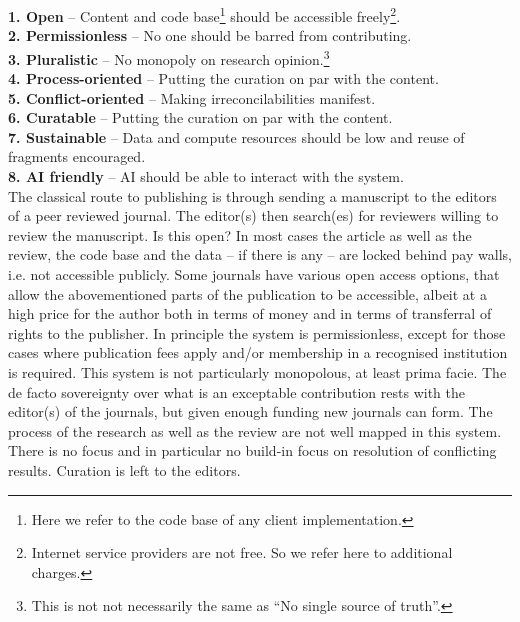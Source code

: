 \documentclass[14pt]{article}
\begin{document}
\indent \textbf{1. Open} -- 
 Content and code base\footnote{Here we refer to the code base of any client implementation.} should be accessible freely\footnote{Internet service providers are not free. So we refer here to additional charges.}.\\
\indent\textbf{2. Permissionless} --
 No one should be barred from contributing.\\
\indent\textbf{3. Pluralistic} -- No monopoly on research opinion.\footnote{This is not not necessarily the same as ``No single source of truth''.}\\
\indent\textbf{4. Process-oriented} -- Putting the curation on par with the content.\\
\indent\textbf{5. Conflict-oriented} -- Making irreconcilabilities manifest.\\
\indent\textbf{6. Curatable} -- Putting the curation on par with the content.\\
\indent\textbf{7. Sustainable} -- 
 Data and compute resources should be low and reuse of fragments encouraged.\\
\indent\textbf{8. AI friendly} -- AI should be able to interact with the system.\\

The classical route to publishing is through sending a manuscript to the editors of a peer reviewed journal. The editor(s) then search(es) for reviewers willing to review the manuscript. Is this open? In most cases the article as well as the review, the code base and the data -- if there is any --  are locked behind pay walls, i.e. not accessible publicly. Some journals have various open access options, that allow the abovementioned parts of the publication to be accessible, albeit at a high price for the author both in terms of money and in terms of transferral of rights to the publisher. In principle the system is permissionless, except for those cases where publication fees apply and/or membership in a recognised institution is required. This system is not particularly monopolous, at least prima facie. The de facto sovereignty over what is an exceptable contribution rests with the editor(s) of the journals, but given enough funding new journals can form. The process of the research as well as the review are not well mapped in this system. There is no focus and in particular no build-in focus on resolution of conflicting results. Curation is left to the editors. 
\end{document}
